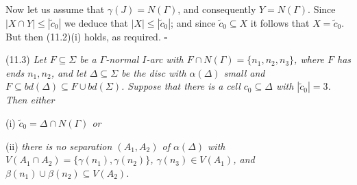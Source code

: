 Now let us assume that $\gamma(J) = N(\Gamma)$, and consequently $Y = N(\Gamma)$. Since $|X \cap Y| \le |\tilde{c}_0|$ we deduce that $|X| \le |\tilde{c}_0|$; and since $\tilde{c}_0 \subseteq X$ it follows that $X = \tilde{c}_0$. But then (11.2)(i) holds, as required. $\square$

\stmt
(11.3) \textit{Let $F \subseteq \Sigma$ be a $\Gamma$-normal $I$-arc with $F \cap N(\Gamma) = \{n_1, n_2, n_3\}$, where $F$ has ends $n_1, n_2$, and let $\Delta \subseteq \Sigma$ be the disc with $\alpha(\Delta)$ small and $F \subseteq bd(\Delta) \subseteq F \cup bd(\Sigma)$. Suppose that there is a cell $c_0 \subseteq \Delta$ with $|\tilde{c}_0| = 3$. Then either}

\hspace*{12pt}(i) \textit{$\tilde{c}_0 = \Delta \cap N(\Gamma)$ or}

\hspace*{12pt}(ii) \textit{there is no separation $(A_1, A_2)$ of $\alpha(\Delta)$ with $V(A_1 \cap A_2) = \{\gamma(n_1), \gamma(n_2)\}$, $\gamma(n_3) \in V(A_1)$, and $\beta(n_1) \cup \beta(n_2) \subseteq V(A_2)$.}
